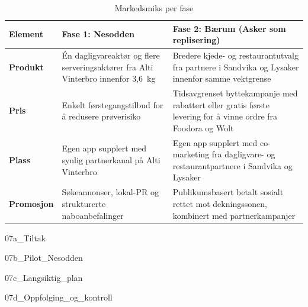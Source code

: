 \begin{table}[H]
\centering
\caption{Markedsmiks per fase}
\label{tab:markedsmiks}
\renewcommand{\arraystretch}{1.35}
\small
\begin{tabularx}{\textwidth}{@{} >{\bfseries}p{2cm} X X @{}}
\toprule
\rowcolor{tableheader}
\color{white}\textbf{Element} &
\color{white}\textbf{Fase 1: Nesodden} &
\color{white}\textbf{Fase 2: Bærum (Asker som replisering)} \\
\midrule
\rowcolor{tablerow}
Produkt & Én dagligvareaktør og flere serveringsaktører fra Alti
Vinterbro innenfor 3{,}6~kg & Bredere kjede- og restaurantutvalg fra
partnere i Sandvika og Lysaker innenfor samme vektgrense \\
Pris & Enkelt førstegangstilbud for å redusere prøverisiko & Tidsavgrenset
byttekampanje med rabattert eller gratis første levering for å vinne
ordre fra Foodora og Wolt \\
\rowcolor{tablerow}
Plass & Egen app supplert med synlig partnerkanal på Alti Vinterbro &
Egen app supplert med co-marketing fra dagligvare- og
restaurantpartnere i Sandvika og Lysaker \\
Promosjon & Søkeannonser, lokal-PR og strukturerte naboanbefalinger &
Publikumsbasert betalt sosialt rettet mot dekningssonen, kombinert med
partnerkampanjer \\
\bottomrule
\end{tabularx}
\end{table}

{07a_Tiltak}

{07b_Pilot_Nesodden}

{07c_Langsiktig_plan}

{07d_Oppfolging_og_kontroll}
